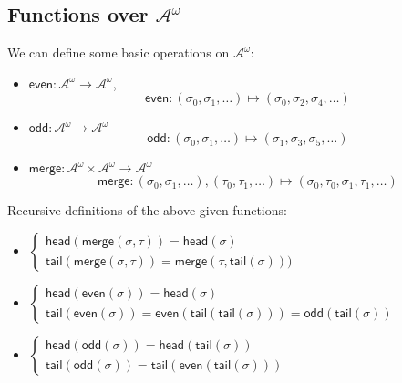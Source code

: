\documentclass{article}
\newcommand{\alphA}{\mathcal{A}}
\newcommand{\odd}{\mathsf{odd}}
\newcommand{\even}{\mathsf{even}}
\newcommand{\merge}{\mathsf{merge}}
\newcommand{\head}{\mathsf{head}}
\newcommand{\tail}{\mathsf{tail}}
\theoremstyle{definition}
\theoremstyle{definition}
\begin{document}
\subsection{Functions over $\alphA^{\omega}$}
We can define some basic operations on $\alphA^\omega$:
\begin{itemize}
\item $ \even\colon \alphA^{\omega} \to \alphA^{\omega} $,
\[
    \even \colon (\sigma_0, \sigma_1, \dots) \mapsto (\sigma_0, \sigma_2 , \sigma_4, \dots) 
\]
\item $\odd \colon \alphA^{\omega} \to \alphA^{\omega} $
\[
    \odd \colon (\sigma_0, \sigma_1, \dots) \mapsto (\sigma_1, \sigma_3 , \sigma_5, \dots) 
\]
\item $ \merge \colon \alphA^{\omega} \times \alphA^\omega \to \alphA^{\omega} $
\[ 
    \merge \colon (\sigma_0, \sigma_1 , \dots) , (\tau_0, \tau_1, \dots) \mapsto (\sigma_0, \tau_0 , \sigma_1 , \tau_1, \dots) 
\]
 
\end{itemize} 
 
Recursive definitions of the above given functions:
\begin{itemize}
\item 
$ 
    \begin{cases}
        \head (\merge (\sigma, \tau)) = \head (\sigma) \\
        \tail (\merge (\sigma, \tau)) = \merge(\tau, \tail(\sigma)))
    \end{cases}
$
\item 
$
    \begin{cases}
        \head(\even(\sigma)) = \head(\sigma) \\
        \tail(\even(\sigma)) = \even(\tail(\tail(\sigma))) = \odd(\tail(\sigma))
    \end{cases}
$
\item 
$
    \begin{cases}
        \head(\odd(\sigma)) = \head(\tail(\sigma))
 \\
        \tail(\odd(\sigma)) = \tail(\even(\tail(\sigma)))
    \end{cases}
$
\end{itemize}
\end{document}
